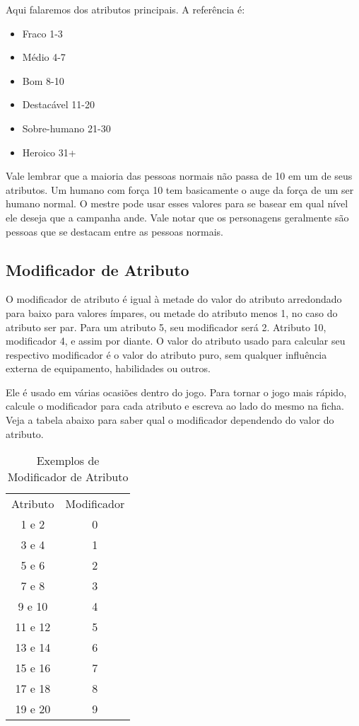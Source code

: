 Aqui falaremos dos atributos principais. A referência é:

\begin{itemize}
	\item Fraco 1-3
	\item Médio 4-7
	\item Bom 8-10
	\item Destacável 11-20
	\item Sobre-humano 21-30
	\item Heroico 31+
\end{itemize}

Vale lembrar que a maioria das pessoas normais não passa de 10 em um de seus atributos. Um humano com força 10 tem basicamente o auge da força de um ser humano normal. O mestre pode usar esses valores para se basear em qual nível ele deseja que a campanha ande. Vale notar que os personagens geralmente são pessoas que se destacam entre as pessoas normais.

\subsection{Modificador de Atributo}

O modificador de atributo é igual à metade do valor do atributo arredondado para baixo para valores ímpares, ou metade do atributo menos 1, no caso do atributo ser par. Para um atributo 5, seu modificador será 2. Atributo 10, modificador 4, e assim por diante. O valor do atributo usado para calcular seu respectivo modificador é o valor do atributo puro, sem qualquer influência externa de equipamento, habilidades ou outros.

Ele é usado em várias ocasiões dentro do jogo. Para tornar o jogo mais rápido, calcule o modificador para cada atributo e escreva ao lado do mesmo na ficha. Veja a tabela abaixo para saber qual o modificador dependendo do valor do atributo.

\begin{table}[htbp]
\begin{center}
\begin{tabular}{|c|c|} \hline 
Atributo&	 Modificador\\\cline{1-2} 
1 e 2&	 0\\ \hline
3 e 4&	 1\\ \hline
5 e 6&	 2\\ \hline
7 e 8&	 3\\ \hline
9 e 10&	 4\\ \hline
11 e 12&	 5\\ \hline
13 e 14&	 6\\ \hline
15 e 16&	 7\\ \hline
17 e 18&	 8\\ \hline
19 e 20&	 9\\ \hline
\end{tabular}
\end{center}
\caption{Exemplos de Modificador de Atributo}
\label{}
\end{table}


